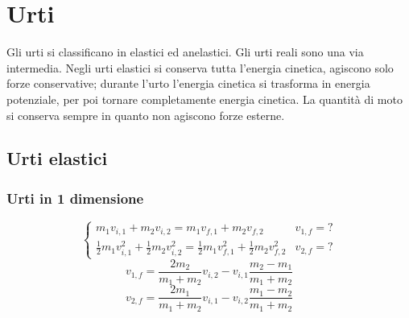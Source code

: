 \section{Urti}
Gli urti si classificano in elastici ed anelastici. Gli urti reali sono una via intermedia. Negli urti elastici si conserva tutta l'energia cinetica, agiscono solo forze conservative; durante l'urto l'energia cinetica si trasforma in energia potenziale, per poi tornare completamente energia cinetica. La quantità di moto si conserva sempre in quanto non agiscono forze esterne.

\subsection{Urti elastici}

\subsubsection{Urti in 1 dimensione}

\[ \left \{
\begin{array}{ll}
   m_1v_{i,1}+m_2v_{i,2}=m_1v_{f,1}+m_2v_{f,2} & v_{1,f}=? \\
   \frac{1}{2}m_1v_{i,1}^2+\frac{1}{2}m_2v_{i,2}^2=\frac{1}{2}m_1v_{f,1}^2+\frac{1}{2}m_2v_{f,2}^2 & v_{2,f}=?
   \end{array}
   \right.\]
\begin{equation*}v_{1,f}=\frac{2m_2}{m_1+m_2}v_{i,2}-v_{i,1}\frac{m_2-m_1}{m_1+m_2}\end{equation*}
\begin{equation*}v_{2,f}=\frac{2m_1}{m_1+m_2}v_{i,1}-v_{i,2}\frac{m_1-m_2}{m_1+m_2}\end{equation*}

